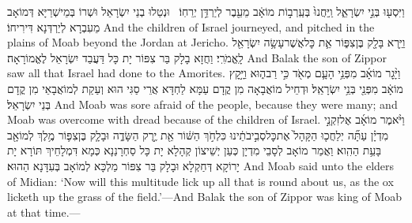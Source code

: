 \newperek
{}%
{וַיִּסְע֖וּ בְּנֵ֣י יִשְׂרָאֵ֑ל וַֽיַּחֲנוּ֙ בְּעַֽרְב֣וֹת מוֹאָ֔ב מֵעֵ֖בֶר לְיַרְדֵּ֥ן יְרֵחֽוֹ׃ \setuma }
{וּנְטַלוּ בְנֵי יִשְׂרָאֵל וּשְׁרוֹ בְּמֵישְׁרַיָּא דְּמוֹאָב מֵעִבְרָא לְיַרְדְּנָא דִּירִיחוֹ׃}
{And the children of Israel journeyed, and pitched in the plains of Moab beyond the Jordan at Jericho.}{}
{וַיַּ֥רְא בָּלָ֖ק בֶּן\maqqaf צִפּ֑וֹר אֵ֛ת כׇּל\maqqaf אֲשֶׁר\maqqaf עָשָׂ֥ה יִשְׂרָאֵ֖ל לָֽאֱמֹרִֽי׃}
{וַחֲזָא בָלָק בַּר צִפּוֹר יָת כָּל דַּעֲבַד יִשְׂרָאֵל לֶאֱמוֹרָאָה׃}
{And Balak the son of Zippor saw all that Israel had done to the Amorites.}{}
{וַיָּ֨גׇר מוֹאָ֜ב מִפְּנֵ֥י הָעָ֛ם מְאֹ֖ד כִּ֣י רַב\maqqaf ה֑וּא וַיָּ֣קׇץ מוֹאָ֔ב מִפְּנֵ֖י בְּנֵ֥י יִשְׂרָאֵֽל׃}
{וּדְחֵיל מוֹאֲבָאָה מִן קֳדָם עַמָּא לַחְדָּא אֲרֵי סַגִּי הוּא וְעַקַת לְמוֹאֲבָאֵי מִן קֳדָם בְּנֵי יִשְׂרָאֵל׃}
{And Moab was sore afraid of the people, because they were many; and Moab was overcome with dread because of the children of Israel.}{}
{וַיֹּ֨אמֶר מוֹאָ֜ב אֶל\maqqaf זִקְנֵ֣י מִדְיָ֗ן עַתָּ֞ה יְלַחֲכ֤וּ הַקָּהָל֙ אֶת\maqqaf כׇּל\maqqaf סְבִ֣יבֹתֵ֔ינוּ כִּלְחֹ֣ךְ הַשּׁ֔וֹר אֵ֖ת יֶ֣רֶק הַשָּׂדֶ֑ה וּבָלָ֧ק בֶּן\maqqaf צִפּ֛וֹר מֶ֥לֶךְ לְמוֹאָ֖ב בָּעֵ֥ת הַהִֽוא׃}
{וַאֲמַר מוֹאָב לְסָבֵי מִדְיָן כְּעַן יְשֵׁיצוֹן קְהָלָא יָת כָּל סַחְרָנַנָא כְּמָא דִּמְלָחֵיךְ תּוֹרָא יָת יָרוֹקָא דְּחַקְלָא וּבָלָק בַּר צִפּוֹר מַלְכָּא לְמוֹאָב בְּעִדָּנָא הַהוּא׃}
{And Moab said unto the elders of Midian: ‘Now will this multitude lick up all that is round about us, as the ox licketh up the grass of the field.’—And Balak the son of Zippor was king of Moab at that time.—}{}
